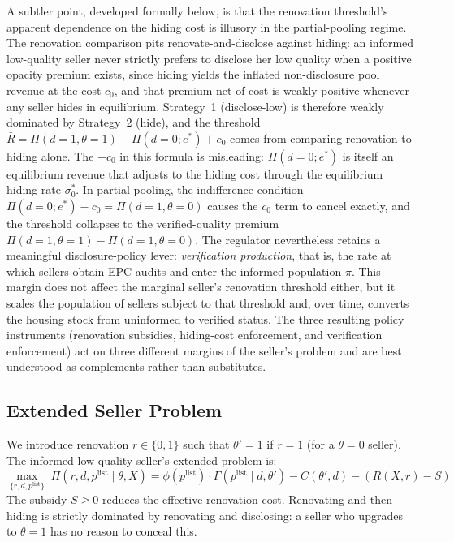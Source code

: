 \documentclass[10pt,letterpaper]{bp-template-concise}
\begin{document}
A subtler point, developed formally below, is that the renovation threshold's apparent dependence on the hiding cost is illusory in the partial-pooling regime. The renovation comparison pits renovate-and-disclose against hiding: an informed low-quality seller never strictly prefers to disclose her low quality when a positive opacity premium exists, since hiding yields the inflated non-disclosure pool revenue at the cost $c_0$, and that premium-net-of-cost is weakly positive whenever any seller hides in equilibrium. Strategy~1 (disclose-low) is therefore weakly dominated by Strategy~2 (hide), and the threshold $\bar R = \Pi(d{=}1,\theta{=}1) - \Pi(d{=}0;e^*) + c_0$ comes from comparing renovation to hiding alone. The $+c_0$ in this formula is misleading: $\Pi(d{=}0;e^*)$ is itself an equilibrium revenue that adjusts to the hiding cost through the equilibrium hiding rate $\sigma_0^*$. In partial pooling, the indifference condition $\Pi(d{=}0;e^*) - c_0 = \Pi(d{=}1,\theta{=}0)$ causes the $c_0$ term to cancel exactly, and the threshold collapses to the verified-quality premium $\Pi(d{=}1,\theta{=}1)-\Pi(d{=}1,\theta{=}0)$. The regulator nevertheless retains a meaningful disclosure-policy lever: \emph{verification production}, that is, the rate at which sellers obtain EPC audits and enter the informed population $\pi$. This margin does not affect the marginal seller's renovation threshold either, but it scales the population of sellers subject to that threshold and, over time, converts the housing stock from uninformed to verified status. The three resulting policy instruments (renovation subsidies, hiding-cost enforcement, and verification enforcement) act on three different margins of the seller's problem and are best understood as complements rather than substitutes.

\subsection{Extended Seller Problem}

We introduce renovation $r\in\{0,1\}$ such that $\theta'=1$ if $r=1$ (for a $\theta=0$ seller). The informed low-quality seller's extended problem is:
\begin{equation}
    \max_{\{r,d,p^{\text{list}}\}}\;\Pi(r,d,p^{\text{list}}\mid\theta,X) = \phi(p^{\text{list}})\cdot\Gamma(p^{\text{list}}\mid d,\theta')-C(\theta',d)-(R(X,r)-S)
    \label{eq:seller_problem}
\end{equation}
The subsidy $S\geq 0$ reduces the effective renovation cost. Renovating and then hiding is strictly dominated by renovating and disclosing: a seller who upgrades to $\theta=1$ has no reason to conceal this.
\end{document}
